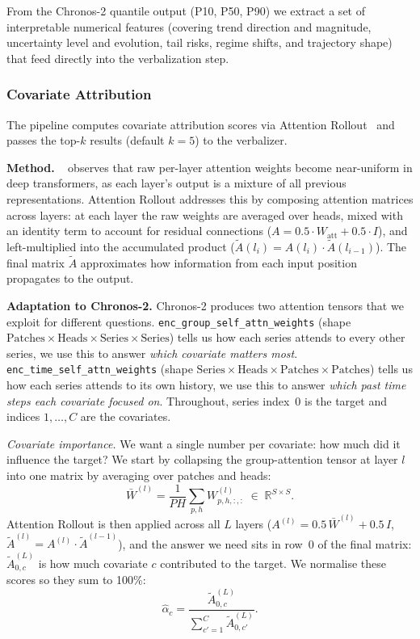 \documentclass[conference]{IEEEtran}
\begin{document}
From the Chronos-2 quantile output (P10, P50, P90) we extract a set of interpretable numerical features (covering trend direction and magnitude, uncertainty level and evolution, tail risks, regime shifts, and trajectory shape) that feed directly into the verbalization step.




\subsubsection{Covariate Attribution}

The pipeline computes covariate attribution scores via Attention Rollout~\cite{abnar2020attentionflow} and passes the top-$k$ results (default $k=5$) to the verbalizer.

\textbf{Method.}
~\cite{abnar2020attentionflow} observes that raw per-layer attention weights become near-uniform in deep transformers, as each layer's output is a mixture of all previous representations.
Attention Rollout addresses this by composing attention matrices across layers: at each layer the raw weights are averaged over heads, mixed with an identity term to account for residual connections ($A = 0.5 \cdot W_{\text{att}} + 0.5 \cdot I$), and left-multiplied into the accumulated product ($\tilde{A}(l_i) = A(l_i) \cdot \tilde{A}(l_{i-1})$).
The final matrix $\tilde{A}$ approximates how information from each input position propagates to the output.

\textbf{Adaptation to Chronos-2.}
Chronos-2 produces two attention tensors that we exploit for different questions.
\texttt{enc\_group\_self\_attn\_weights} (shape $\text{Patches} \times \text{Heads} \times \text{Series} \times \text{Series}$) tells us how each series attends to every other series, we use this to answer \emph{which covariate matters most}.
\texttt{enc\_time\_self\_attn\_weights} (shape $\text{Series} \times \text{Heads} \times \text{Patches} \times \text{Patches}$) tells us how each series attends to its own history, we use this to answer \emph{which past time steps each covariate focused on}.
Throughout, series index~0 is the target and indices $1, \ldots, C$ are the covariates.

\emph{Covariate importance.}
We want a single number per covariate: how much did it influence the target?
We start by collapsing the group-attention tensor at layer $l$ into one matrix by averaging over patches and heads:
%
\begin{equation}
  \bar{W}^{(l)} = \frac{1}{PH}\sum_{p,h} W^{(l)}_{p,h,:,:} \;\in\; \mathbb{R}^{S \times S}.
\end{equation}
%
Attention Rollout is then applied across all $L$ layers ($A^{(l)} = 0.5\,\bar{W}^{(l)} + 0.5\,I$, $\tilde{A}^{(l)} = A^{(l)} \cdot \tilde{A}^{(l-1)}$), and the answer we need sits in row~0 of the final matrix: $\tilde{A}^{(L)}_{0,c}$ is how much covariate $c$ contributed to the target.
We normalise these scores so they sum to 100\%:
%
\begin{equation}
  \hat{\alpha}_c = \frac{\tilde{A}^{(L)}_{0,c}}{\sum_{c'=1}^{C}\tilde{A}^{(L)}_{0,c'}}.
\end{equation}
\end{document}
